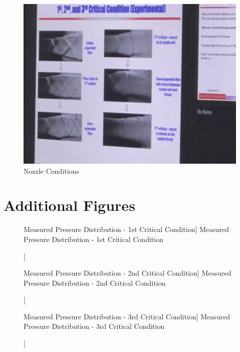 \begin{figure}[htpb]
    \centering
    \includegraphics[width=0.75\linewidth]{Figures/six_conditions.jpeg}
    \caption[Nozzle Conditions]{Nozzle Conditions}
    \label{fig: NozzleConditions}
\end{figure}

\newpage

\section{Additional Figures} \label{sec:additional_apparatus}

\begin{figure}[htpb]
    \centering
     
     \caption
     [Measured Pressure Distribution - 1st Critical Condition]
     {Measured Pressure Distribution - 1st Critical Condition}
     \label{fig: MeasuredPressureDistribution1stCriticalCondition}
\end{figure}

\begin{figure}[htpb]
    \centering
     
     \caption
     [Measured Pressure Distribution - 2nd Critical Condition]
     {Measured Pressure Distribution - 2nd Critical Condition}
     \label{fig: MeasuredPressureDistribution2ndCriticalCondition}
\end{figure}

\begin{figure}[htpb]
    \centering
     
     \caption
     [Measured Pressure Distribution - 3rd Critical Condition]
     {Measured Pressure Distribution - 3rd Critical Condition}
     \label{fig: MeasuredPressureDistribution3rdCriticalCondition}
\end{figure}

